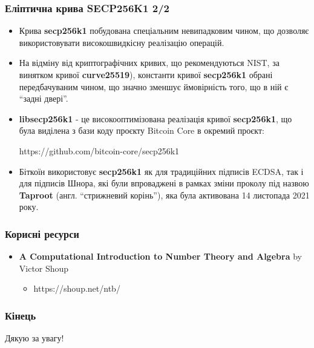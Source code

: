 \documentclass{beamer}
\begin{document}
\begin{frame}
  \frametitle{Еліптична крива SECP256K1 2/2}
  \begin{small}
    \begin{itemize}
    \item Крива \textbf{secp256k1} побудована спеціальним невипадковим чином, що
      дозволяє використовувати високошвидкісну реалізацію операцій.
    \item На відміну від криптографічних кривих, що рекомендуються NIST, за
      винятком кривої \textbf{curve25519}), константи кривої \textbf{secp256k1}
      обрані передбачуваним чином, що значно зменшує ймовірність того, що в ній є
      ``задні двері''.
    \item \textbf{libsecp256k1} - це високооптимізована реалізація кривої
      \textbf{secp256k1}, що була виділена з бази коду проєкту Bitcoin Core в
      окремий проєкт:
      \begin{center}
        https://github.com/bitcoin-core/secp256k1
      \end{center}
    \item Біткоїн використовує \textbf{secp256k1} як для традиційних підписів
      ECDSA, так і для підписів Шнора, які були впроваджені в рамках зміни проколу
      під назвою \textbf{Taproot} (англ. ``стрижневий корінь''), яка була
      активована 14 листопада 2021 року.
    \end{itemize}
  \end{small}
\end{frame}

\begin{frame}
  \frametitle{Корисні ресурси}
  \begin{itemize}
  \item \textbf{A Computational Introduction to Number Theory and Algebra} by
    Victor Shoup
    \begin{itemize}
    \item https://shoup.net/ntb/
    \end{itemize}
  \end{itemize}
\end{frame}

\begin{frame}
  \frametitle{Кінець}
  \begin{center}
    Дякую за увагу!
  \end{center}
\end{frame}
\end{document}
